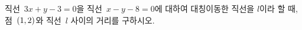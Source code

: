 직선~$3x+y-3=0$을 직선~$x-y-8=0$에 대하여 대칭이동한 직선을 $l$이라 할 때, 점~$(1{,}\mkern3mu\mathopen{}2)$와 직선~$l$ 사이의 거리를 구하시오.
